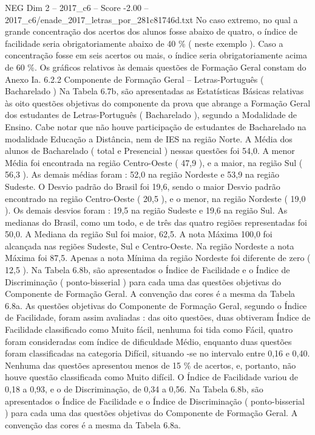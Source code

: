 \begin{textsample}{NEG Dim 2 – 2017\_c6 – Score -2.00 – 2017\_c6/enade\_2017\_letras\_por\_281c81746d.txt}
No caso extremo, no qual a grande concentração dos acertos dos alunos fosse abaixo de quatro, o índice de facilidade seria obrigatoriamente abaixo de 40 \% ( neste exemplo ).
Caso a concentração fosse em seis acertos ou mais, o índice seria obrigatoriamente acima de 60 \%.
Os gráficos relativos às demais questões de Formação Geral constam do Anexo Ia. 6.2.2 Componente de Formação Geral – Letras-Português ( Bacharelado ) Na Tabela 6.7b, são apresentadas as Estatísticas Básicas relativas às oito questões objetivas do componente da prova que abrange a Formação Geral dos estudantes de Letras-Português ( Bacharelado ), segundo a Modalidade de Ensino.
Cabe notar que não houve participação de estudantes de Bacharelado na modalidade Educação a Distância, nem de IES na região Norte.
A Média dos alunos de Bacharelado ( total e Presencial ) nessas questões foi 54,0.
A menor Média foi encontrada na região Centro-Oeste ( 47,9 ), e a maior, na região Sul ( 56,3 ).
As demais médias foram : 52,0 na região Nordeste e 53,9 na região Sudeste.
O Desvio padrão do Brasil foi 19,6, sendo o maior Desvio padrão encontrado na região Centro-Oeste ( 20,5 ), e o menor, na região Nordeste ( 19,0 ).
Os demais desvios foram : 19,5 na região Sudeste e 19,6 na região Sul.
As medianas do Brasil, como um todo, e de três das quatro regiões representadas foi 50,0.
A Mediana da região Sul foi maior, 62,5.
A nota Máxima 100,0 foi alcançada nas regiões Sudeste, Sul e Centro-Oeste.
Na região Nordeste a nota Máxima foi 87,5.
Apenas a nota Mínima da região Nordeste foi diferente de zero ( 12,5 ).
Na Tabela 6.8b, são apresentados o Índice de Facilidade e o Índice de Discriminação ( ponto-bisserial ) para cada uma das questões objetivas do Componente de Formação Geral.
A convenção das cores é a mesma da Tabela 6.8a.
As questões objetivas do Componente de Formação Geral, segundo o Índice de Facilidade, foram assim avaliadas : das oito questões, duas obtiveram Índice de Facilidade classificado como Muito fácil, nenhuma foi tida como Fácil, quatro foram consideradas com índice de dificuldade Médio, enquanto duas questões foram classificadas na categoria Difícil, situando -se no intervalo entre 0,16 e 0,40.
Nenhuma das questões apresentou menos de 15 \% de acertos, e, portanto, não houve questão classificada como Muito difícil.
O Índice de Facilidade variou de 0,18 a 0,93, e o de Discriminação, de 0,34 a 0,56.
Na Tabela 6.8b, são apresentados o Índice de Facilidade e o Índice de Discriminação ( ponto-bisserial ) para cada uma das questões objetivas do Componente de Formação Geral.
A convenção das cores é a mesma da Tabela 6.8a.

\end{textsample}
